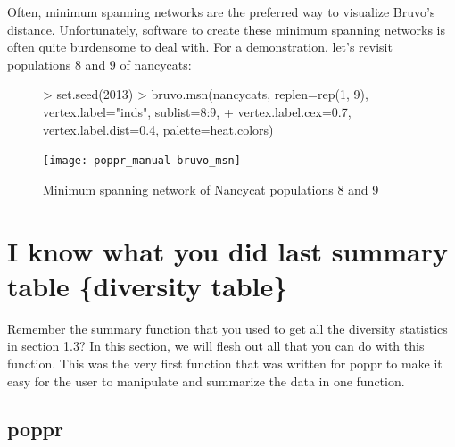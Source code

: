 \documentclass[letterpaper]{article}
\newcommand{\tab}{\hspace*{1em}}
\begin{document}
Often, minimum spanning networks are the preferred way to visualize Bruvo's distance. Unfortunately, software to create these minimum spanning networks is often quite burdensome to deal with. For a demonstration, let's revisit populations 8 and 9 of nancycats: 
\begin{figure}[h!]
  \centering
  \caption{Minimum spanning network of Nancycat populations 8 and 9}
  \label{mst_bruvo}
\begin{Schunk}
\begin{Sinput}
> set.seed(2013)
> bruvo.msn(nancycats, replen=rep(1, 9), vertex.label="inds", sublist=8:9, 
+           vertex.label.cex=0.7, vertex.label.dist=0.4, palette=heat.colors)
\end{Sinput}
\end{Schunk}
\texttt{[image: poppr\_manual-bruvo\_msn]}
\end{figure}
\section{I know what you did last summary table \{diversity table\}}

\tab\tab Remember the summary function that you used to get all the diversity statistics in section 1.3? In this section, we will flesh out all that you can do with this function. This was the very first function that was written for poppr to make it easy for the user to manipulate and summarize the data in one function.
\subsection{poppr}
\end{document}
